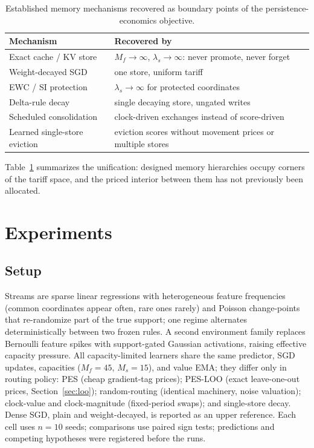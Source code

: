 \documentclass[11pt]{article}
\begin{document}
\begin{table}[t]
\centering
\caption{Established memory mechanisms recovered as boundary points of the persistence-economics
objective.}
\label{tab:corners}
\small
\begin{tabular}{ll}
\toprule
Mechanism & Recovered by \\
\midrule
Exact cache / KV store & $M_{f}\to\infty$, $\lambda_{s}\to\infty$: never promote, never forget \\
Weight-decayed SGD & one store, uniform tariff \\
EWC / SI protection & $\lambda_{s}\to\infty$ for protected coordinates \\
Delta-rule decay & single decaying store, ungated writes \\
Scheduled consolidation & clock-driven exchanges instead of score-driven \\
Learned single-store eviction & eviction scores without movement prices or multiple stores \\
\bottomrule
\end{tabular}
\end{table}

Table~\ref{tab:corners} summarizes the unification: designed memory hierarchies occupy corners of the
tariff space, and the priced interior between them has not previously been allocated.
\section{Experiments}
\label{sec:experiments}

\subsection{Setup}
Streams are sparse linear regressions with heterogeneous feature frequencies (common coordinates appear
often, rare ones rarely) and Poisson change-points that re-randomize part of the true support; one
regime alternates deterministically between two frozen rules. A second environment family replaces
Bernoulli feature spikes with support-gated Gaussian activations, raising effective capacity pressure.
All capacity-limited learners share the same predictor, SGD updates, capacities ($M_f{=}45$,
$M_s{=}15$), and value EMA; they differ only in routing policy: PES (cheap gradient-tag prices); PES-LOO (exact leave-one-out
prices, Section~\ref{sec:loo}); random-routing (identical machinery, noise valuation); clock-value and
clock-magnitude (fixed-period swaps); and single-store decay. Dense SGD, plain and weight-decayed, is
reported as an upper reference. Each cell uses $n=10$ seeds; comparisons use paired
sign tests; predictions and competing hypotheses were registered before the runs.
\end{document}
